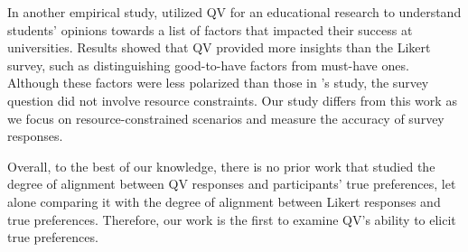 In another empirical study, \textcite{naylor2017first} utilized QV for an educational research to understand students' opinions towards a list of factors that impacted their success at universities. Results showed that QV provided more insights than the Likert survey, such as distinguishing good-to-have factors from must-have ones. Although these factors were less polarized than those in \citeauthor{quarfoot2017quadratic}'s study, the survey question did not involve resource constraints. Our study differs from this work as we focus on resource-constrained scenarios and measure the accuracy of survey responses.

Overall, to the best of our knowledge, there is no prior work that studied the degree of alignment between QV responses and participants' true preferences, let alone comparing it with the degree of alignment between Likert responses and true preferences. Therefore, our work is the first to examine QV's ability to elicit true preferences.







